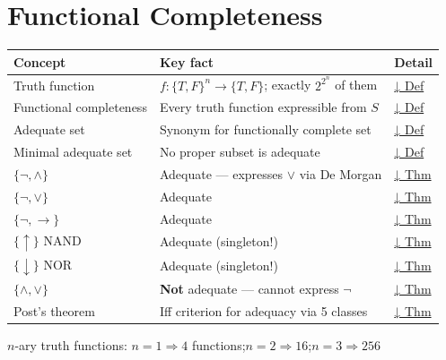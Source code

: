 
\section{Functional Completeness}

\begin{tcolorbox}[colback=gray!6, colframe=gray!40, arc=2pt,
  left=6pt, right=6pt, top=4pt, bottom=4pt,
  title={\small\textbf{Functional Completeness — Quick Reference}},
  fonttitle=\small\bfseries]
\small
\begin{tabular}{l l l}
\toprule
\textbf{Concept} & \textbf{Key fact} & \textbf{Detail} \\
\midrule
Truth function         & $f:\{T,F\}^n\to\{T,F\}$; exactly $2^{2^n}$ of them & \hyperref[def:truth-fn]{↓ Def} \\
Functional completeness & Every truth function expressible from $S$ & \hyperref[def:func-complete]{↓ Def} \\
Adequate set           & Synonym for functionally complete set & \hyperref[def:adequate]{↓ Def} \\
Minimal adequate set   & No proper subset is adequate & \hyperref[def:minimal]{↓ Def} \\
\midrule
$\{\neg,\wedge\}$       & Adequate — expresses $\vee$ via De Morgan & \hyperref[thm:std-adequate]{↓ Thm} \\
$\{\neg,\vee\}$         & Adequate & \hyperref[thm:std-adequate]{↓ Thm} \\
$\{\neg,\rightarrow\}$  & Adequate & \hyperref[thm:std-adequate]{↓ Thm} \\
$\{\uparrow\}$ NAND     & Adequate (singleton!) & \hyperref[thm:nand-adequate]{↓ Thm} \\
$\{\downarrow\}$ NOR    & Adequate (singleton!) & \hyperref[thm:nor-adequate]{↓ Thm} \\
$\{\wedge,\vee\}$       & \textbf{Not} adequate — cannot express $\neg$ & \hyperref[thm:non-adequate]{↓ Thm} \\
Post's theorem          & Iff criterion for adequacy via 5 classes & \hyperref[thm:post]{↓ Thm} \\
\bottomrule
\end{tabular}

\vspace{0.4em}
\small $n$-ary truth functions: $n=1 \Rightarrow 4$ functions;\quad $n=2 \Rightarrow 16$;\quad $n=3 \Rightarrow 256$
\end{tcolorbox}

